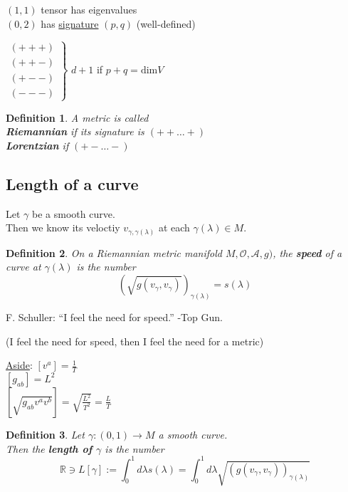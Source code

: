 \documentclass[10pt, twoside]{amsart}
\newtheorem{definition}{Definition}
\begin{document}
\begin{multicols*}{2}
$(1,1)$ tensor has eigenvalues \\
$(0,2)$ has \underline{signature} $(p,q)$ (well-defined)

$\left. \begin{aligned}
  (+++) \\
  (++-) \\
  (+--) \\
  (---) \end{aligned} \right\rbrace$ $d+1$ if $p+q = \text{dim}V$


\begin{definition} A metric is called  \\
\textbf{Riemannian} if its signature is $(++ \dots +)$ \\
\textbf{Lorentzian} if $(+-\dots -)$ 
\end{definition}


\subsection{Length of a curve}

Let $\gamma$ be a smooth curve. \\
Then we know its veloctiy $v_{\gamma, \gamma(\lambda)}$ at each $\gamma(\lambda) \in M$.  

\begin{definition}
  On a Riemannian metric manifold $M, \mathcal{O},\mathcal{A},g)$, the \textbf{speed} of a curve at $\gamma(\lambda)$ is the number 
\[
(\sqrt{ g(v_{\gamma}, v_{\gamma}) })_{\gamma(\lambda)} = s(\lambda)
\]
\end{definition}

F. Schuller: ``I feel the need for speed.'' -Top Gun.  

(I feel the need for speed, then I feel the need for a metric)

\underline{Aside}: $[v^a] = \frac{1}{T}$ \\
\phantom{Aside:} $[g_{ab}] = L^2 $ \\
\phantom{Aside:} $[\sqrt{g_{ab}v^av^b}] = \sqrt{ \frac{L^2}{T^2}} = \frac{L}{T}$

\begin{definition}
  Let $\gamma:(0,1) \to M$ a smooth curve.  \\
Then the \textbf{length of $\gamma$} is the number 
\[
\mathbb{R} \ni L[\gamma] := \int_0^1 d\lambda s(\lambda) = \int_0^1 d\lambda \sqrt{ (g(v_{\gamma}, v_{\gamma}))_{\gamma(\lambda)}}
\]
\end{definition}


\end{multicols*}
\end{document}
